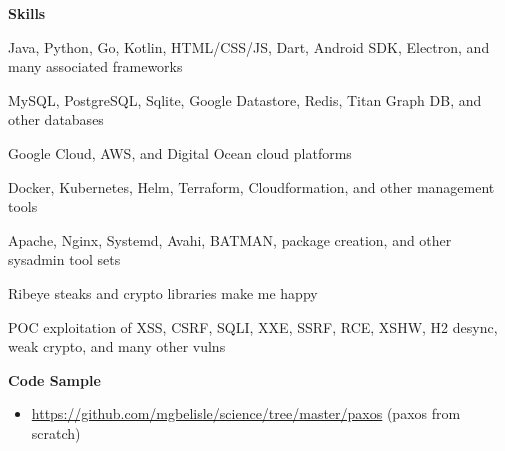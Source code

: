 \documentclass[10pt, a4paper]{article}
\begin{document}
\textbf{Skills}
\begin{itemize*}
  \item Java, Python, Go, Kotlin, HTML/CSS/JS, Dart, Android SDK, Electron, and many associated frameworks
  \item MySQL, PostgreSQL, Sqlite, Google Datastore, Redis, Titan Graph DB, and other databases
  \item Google Cloud, AWS, and Digital Ocean cloud platforms
  \item Docker, Kubernetes, Helm, Terraform, Cloudformation, and other management tools
  \item Apache, Nginx, Systemd, Avahi, BATMAN, package creation, and other sysadmin tool sets
  \item Ribeye steaks and crypto libraries make me happy
  \item POC exploitation of XSS, CSRF, SQLI, XXE, SSRF, RCE, XSHW, H2 desync, weak crypto, and many other vulns
\end{itemize*}
\textbf{Code Sample}
\begin{itemize}
  \item[] \url{https://github.com/mgbelisle/science/tree/master/paxos} (paxos from scratch)
\end{itemize}
\end{document}
